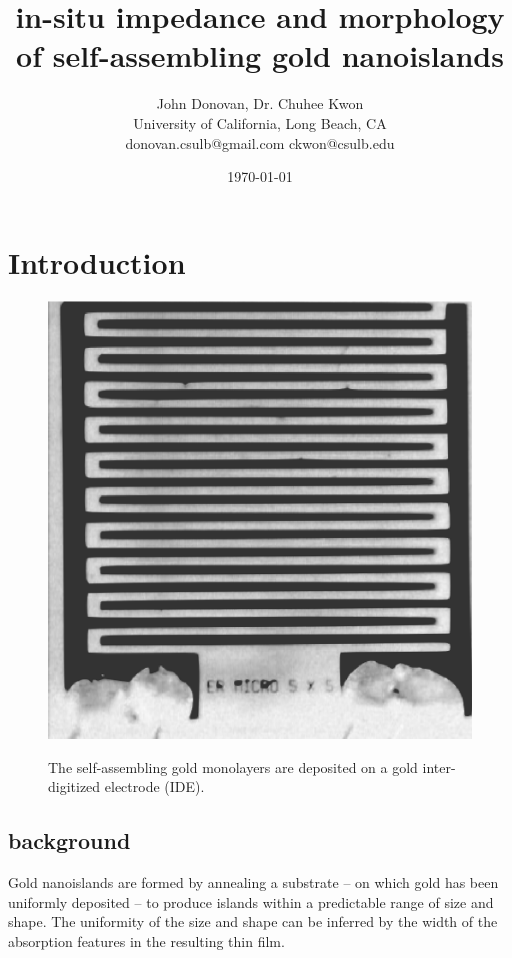 \documentclass[12pt,oneside,english]{article}
\begin{document}
\sffamily

        \title{in-situ impedance and morphology of self-assembling gold nanoislands}

	\author{John Donovan, Dr. Chuhee Kwon\\
	University of California, Long Beach, CA\\
	{\small donovan.csulb@gmail.com ckwon@csulb.edu}}
	
        \date{\today}

	\maketitle


        \section{Introduction}

	\begin{figure}
	\includegraphics[scale=0.4]{images/IDE.eps} \label{f:IDE}
	\caption{The self-assembling gold monolayers are deposited on a gold inter-digitized electrode (IDE).}
	\end{figure}
	
	\subsection{background}
	Gold nanoislands  are formed by annealing a substrate -- on which gold has been uniformly deposited -- to produce islands within a predictable range of size and shape.
	The uniformity of the size and shape can be inferred by the width of the absorption features in the resulting thin film.
\end{document}
